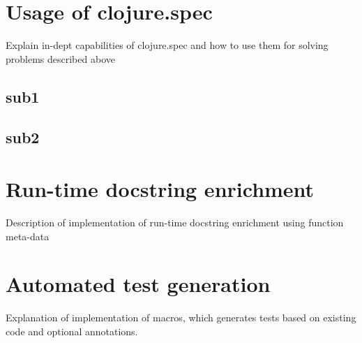 \section{Usage of clojure.spec}
Explain in-dept capabilities of clojure.spec and how to use them for solving
problems described above
\subsection{sub1}
\subsection{sub2}

\section{Run-time docstring enrichment}
Description of implementation of run-time docstring enrichment using function
meta-data

\section{Automated test generation}
Explanation of implementation of macros, which generates tests based on existing
code and optional annotations.
